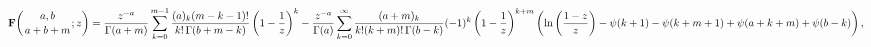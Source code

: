 \[\mathop{\mathbf{F}\/}\nolimits\!\left({a,b\atop a+b+m};z\right)=\frac{z^{-a}}{%
\mathop{\Gamma\/}\nolimits\!\left(a+m\right)}\sum_{k=0}^{m-1}\frac{(a)_{k}(m-k%
-1)!}{k!\mathop{\Gamma\/}\nolimits\!\left(b+m-k\right)}\left(1-\frac{1}{z}%
\right)^{k}-\frac{z^{-a}}{\mathop{\Gamma\/}\nolimits\!\left(a\right)}\sum_{k=0%
}^{\infty}\frac{(a+m)_{k}}{k!(k+m)!\mathop{\Gamma\/}\nolimits\!\left(b-k\right%
)}(-1)^{k}\left(1-\frac{1}{z}\right)^{k+m}\*\left(\mathop{\ln\/}\nolimits\left%
(\frac{1-z}{z}\right)-\mathop{\psi\/}\nolimits\!\left(k+1\right)-\mathop{\psi%
\/}\nolimits\!\left(k+m+1\right)+\mathop{\psi\/}\nolimits\!\left(a+k+m\right)+%
\mathop{\psi\/}\nolimits\!\left(b-k\right)\right),\]